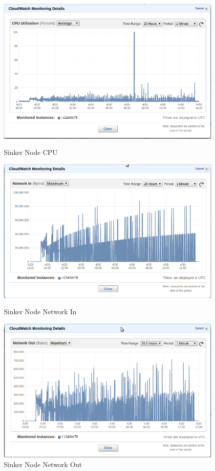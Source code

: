 \begin{figure}[!htb]
  \includegraphics[width=\linewidth]{pics/sinker_cpu.png}
  \caption{Sinker Node CPU}\label{fig:sinker_cpu}
\endminipage\hfill
{}
  \includegraphics[width=\linewidth]{pics/sinker_network_in.png}
  \caption{Sinker Node Network In}\label{fig:sinker_in}
\endminipage\hfill
{}
  \includegraphics[width=\linewidth]{pics/sinker_network_out.png}
  \caption{Sinker Node Network Out}\label{fig:sinker_out}
\endminipage\hfill
\end{figure}

